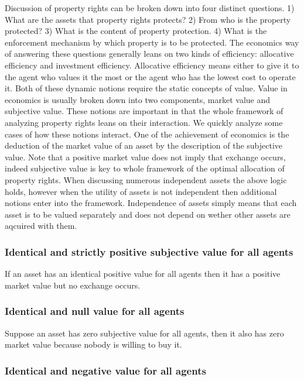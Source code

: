 \documentclass[12pt]{article}
\numberwithin{equation}{section}
\begin{document}
Discussion of property rights can be broken down into four distinct questions. 1) What are the assets that property rights protects? 2) From who is the property protected? 3) What is the content of property protection. 4) What is the enforcement mechanism by which property is to be protected. The economics way of answering these questions generally leans on two kinds of efficiency: allocative efficiency and investment efficiency. Allocative efficiency means either to give it to the agent who values it the most or the agent who has the lowest cost to operate it. Both of these dynamic notions require the static concepts of value. Value in economics is usually broken down into two components, market value and subjective value. These notions are important in that the whole framework of analyzing property rights leans on their interaction. We quickly analyze some cases of how these notions interact. One of the achievement of economics is the deduction of the market value of an asset by the description of the subjective value. Note that a positive market value does not imply that exchange occurs, indeed subjective value is key to whole framework of the optimal allocation of property rights. When discussing numerous independent assets the above logic holds, however when the utility of assets is not independent then additional notions enter into the framework. Independence of assets simply means that each asset is to be valued separately and does not depend on wether other assets are aqcuired with them. 


\subsubsection{Identical and strictly positive subjective value for all agents}

If an asset has an identical positive value for all agents then it has a positive market value but no exchange occurs. 

\subsubsection{Identical and null value for all agents}

Suppose an asset has zero subjective value for all agents, then it also has zero market value because nobody is willing to buy it. 

\subsubsection{Identical and negative value for all agents}
\end{document}
